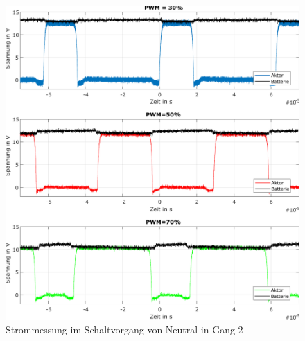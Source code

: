 \begin{figure} [h]
	\centering
	\includegraphics[width=1\linewidth]{Bilder/spannungsverlauefe.pdf}
	\caption{Strommessung im Schaltvorgang von Neutral in Gang 2}
	\label{fig:spannungsverlaeufe}
\end{figure}

